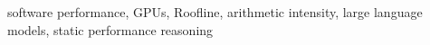 \documentclass[10pt,conference]{IEEEtran}
\newcommand{\bandwidthbound}{\textsc{BB}\xspace}
\newcommand{\computebound}{\textsc{CB}\xspace}
\begin{document}
%

\begin{IEEEkeywords}
software performance, GPUs, Roofline, arithmetic intensity, large language models, static performance reasoning
\end{IEEEkeywords}









\clearpage



%
\end{document}
